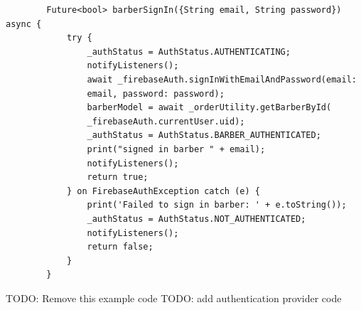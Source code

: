 \documentclass[12pt]{article}
\begin{document}
	\begin{verbatim}
		Future<bool> barberSignIn({String email, String password}) async {
			try {
				_authStatus = AuthStatus.AUTHENTICATING;
				notifyListeners();
				await _firebaseAuth.signInWithEmailAndPassword(email: 
				email, password: password);
				barberModel = await _orderUtility.getBarberById(
				_firebaseAuth.currentUser.uid);
				_authStatus = AuthStatus.BARBER_AUTHENTICATED;
				print("signed in barber " + email);
				notifyListeners();
				return true;
			} on FirebaseAuthException catch (e) {
				print('Failed to sign in barber: ' + e.toString());
				_authStatus = AuthStatus.NOT_AUTHENTICATED;
				notifyListeners();
				return false;
			}
		} 
	\end{verbatim}
	TODO: Remove this example code
	TODO: add authentication provider code
	
\end{document}
